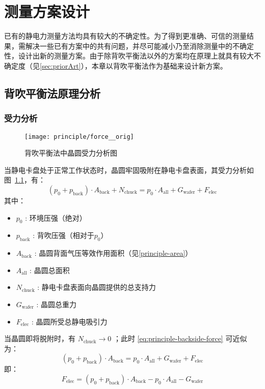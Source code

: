 \chapter{测量方案设计}\label{ch:principle}

已有的静电力测量方法均具有较大的不确定性。为了得到更准确、可信的测量结果，需解决一些已有方案中的共有问题，并尽可能减小乃至消除测量中的不确定性，设计出新的测量方案。由于除背吹平衡法以外的方案均在原理上就具有较大不确定度（见\ref{sec:priorArt}），本章以背吹平衡法作为基础来设计新方案。



\section[背吹法原理分析]{背吹平衡法原理分析}\label{sec:principle-backside}


\subsection{受力分析}\label{sec:principle-backside-force}

\begin{figure}[hbt]
\centering
\texttt{[image: principle/force\_\_orig]}
\caption[背吹平衡法晶圆受力]{背吹平衡法中晶圆受力分析图}
\label{fig:principle-backside-force}
\end{figure}

当静电卡盘处于正常工作状态时，晶圆牢固吸附在静电卡盘表面，其受力分析如图~\ref{fig:principle-backside-force}，有：
\begin{equation}
\label{eq:principle-backside-force}
(p_{0} + p_{\mathrm{back}}) \cdot A_{\mathrm{back}} + N_{\mathrm{chuck}} = p_0 \cdot A_{\mathrm{all}} + G_{\mathrm{wafer}} + F_{\mathrm{elec}}
\end{equation}
其中：
\begin{itemize}
  \item $p_{0}$ : 环境压强（绝对）
  \item $p_{\mathrm{back}}$  : 背吹压强（相对于$p_{0}$）
  \item $A_{\mathrm{back}}$  : 晶圆背面气压等效作用面积（见\ref{principle-area}）
  \item $A_{\mathrm{all}}$   : 晶圆总面积
  \item $N_{\mathrm{chuck}}$ : 静电卡盘表面向晶圆提供的总支持力
  \item $G_{\mathrm{wafer}}$ : 晶圆总重力
  \item $F_{\mathrm{elec}}$  : 晶圆所受总静电吸引力
\end{itemize}
当晶圆即将脱附时，有 $N_{\mathrm{chuck}} \to 0$ ；此时 \eqref{eq:principle-backside-force} 可近似为：
\begin{equation*}
\label{eq:principle-backside-force'}
(p_{0} + p_{\mathrm{back}}) \cdot A_{\mathrm{back}} = p_0 \cdot A_{\mathrm{all}} + G_{\mathrm{wafer}} + F_{\mathrm{elec}}
\end{equation*}
即：
\begin{equation}
\label{eq:principle-backside-force''}
F_{\mathrm{elec}} = (p_{0} + p_{\mathrm{back}}) \cdot A_{\mathrm{back}} - p_0 \cdot A_{\mathrm{all}} - G_{\mathrm{wafer}}
\end{equation}


